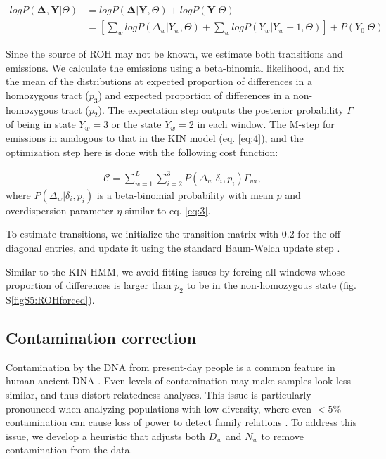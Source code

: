 \documentclass[12pt, letterpaper]{article}
\begin{document}
\begin{align}\label{eq:10}
    log P(\mathbf{\Delta},\mathbf{Y}|\Theta) &= log P(\mathbf{\Delta}|\mathbf{Y},\Theta) + log P(\mathbf{Y}|\Theta)\nonumber\\
 &= [\sum_{w} log P(\Delta_w|Y_w, \Theta) + \sum_{w} log P(Y_w|Y_w-1, \Theta)] + P(Y_0| \Theta)
\end{align}

Since the source of ROH may not be known,  we estimate both transitions and emissions. We calculate the emissions using a beta-binomial likelihood, and fix the mean of the distributions at expected proportion of differences in a homozygous tract ($p_3$) and expected proportion of differences in a non-homozygous tract ($p_2$). The expectation step outputs the posterior probability $\Gamma$ of being in state $Y_w=3$ or the state $Y_w=2$ in each window. The M-step for emissions in analogous to that in the KIN model (eq. \ref{eq:4}), and the optimization step here is done with the following cost function:

\begin{align}\label{eq:11}
\mathcal{C} = \sum_{w=1}^L \sum_{i=2}^3 P(\Delta_w|\delta_{i},p_{i}) \Gamma_{wi} ,
\end{align}
where $P(\Delta_w|\delta_{i},p_{i})$ is a beta-binomial probability with mean $p$ and overdispersion parameter $\eta$ similar to eq. \ref{eq:3}.

To estimate transitions, we initialize the transition matrix with 0.2 for the off-diagonal entries, and update it using the standard Baum-Welch update step \cite{baum_maximization_1970}.

Similar to the KIN-HMM, we avoid fitting issues by forcing all windows whose proportion of differences is larger than $p_2$ to be in the non-homozygous state (fig. S\ref{figS5:ROHforced}).

\subsection{Contamination correction}\label{contam}
Contamination by the DNA from present-day people is a common feature in human ancient DNA \cite{peyregne_present-day_2020}. Even levels of contamination may make samples look less similar, and thus distort relatedness analyses. This issue is particularly pronounced  when analyzing populations with low diversity, where even $<5\%$ contamination can cause loss of power to detect family relations . To address this issue, we develop a heuristic that adjusts both $D_w$ and $N_w$ to remove contamination from the data.
\end{document}
